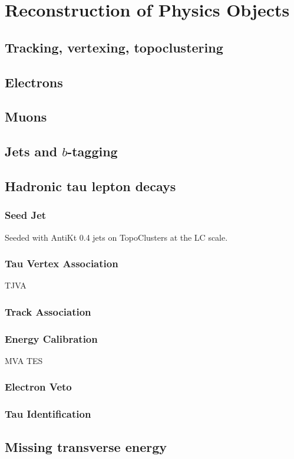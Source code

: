 \section{Reconstruction of Physics Objects}
\subsection{Tracking, vertexing, topoclustering}
\subsection{Electrons}
\subsection{Muons}
\subsection{Jets and $b$-tagging}

\subsection{Hadronic tau lepton decays}

\subsubsection{Seed Jet}

Seeded with AntiKt 0.4 jets on TopoClusters at the LC scale.

\subsubsection{Tau Vertex Association}

TJVA

\subsubsection{Track Association}

\cite{duschinger}


\subsubsection{Energy Calibration}

MVA TES

\subsubsection{Electron Veto}
\subsubsection{Tau Identification}


\subsection{Missing transverse energy}

